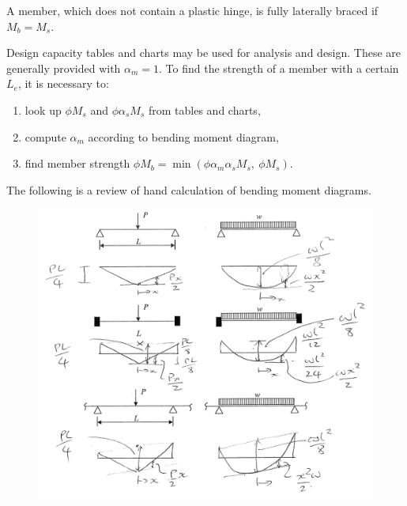 A member, which does not contain a plastic hinge, is fully laterally braced if $M_b=M_s$.

Design capacity tables and charts may be used for analysis and design. These are generally provided with $\alpha_m=1$. To find the strength of a member with a certain $L_e$, it is necessary to:
\begin{enumerate}
\item look up $\phi{}M_s$ and $\phi{}\alpha_sM_s$ from tables and charts,
\item compute $\alpha_m$ according to bending moment diagram,
\item find member strength $\phi{}M_b=\min\left(\phi\alpha_m\alpha_sM_s,~\phi{}M_s\right)$.
\end{enumerate}

The following is a review of hand calculation of bending moment diagrams.
\begin{figure}[H]
\centering\includegraphics[width=.99\textwidth]{PIC/CH05/BMD}
\end{figure}

